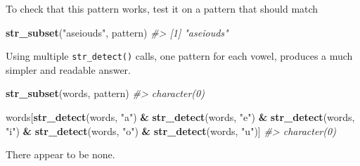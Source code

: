 \documentclass[]{book}
\newenvironment{Shaded}{\begin{snugshade}}{\end{snugshade}}
\newcommand{\CommentTok}[1]{\textcolor[rgb]{0.56,0.35,0.01}{\textit{#1}}}
\newcommand{\ControlFlowTok}[1]{\textcolor[rgb]{0.13,0.29,0.53}{\textbf{#1}}}
\newcommand{\DataTypeTok}[1]{\textcolor[rgb]{0.13,0.29,0.53}{#1}}
\newcommand{\DecValTok}[1]{\textcolor[rgb]{0.00,0.00,0.81}{#1}}
\newcommand{\KeywordTok}[1]{\textcolor[rgb]{0.13,0.29,0.53}{\textbf{#1}}}
\newcommand{\NormalTok}[1]{#1}
\newcommand{\OperatorTok}[1]{\textcolor[rgb]{0.81,0.36,0.00}{\textbf{#1}}}
\newcommand{\StringTok}[1]{\textcolor[rgb]{0.31,0.60,0.02}{#1}}
\theoremstyle{plain}
\theoremstyle{remark}
\begin{document}
\begin{enumerate}
\begin{Shaded}
\end{Shaded}

  To check that this pattern works, test it on a pattern that should
  match

\begin{Shaded}
\begin{Highlighting}[]
\KeywordTok{str_subset}\NormalTok{(}\StringTok{"aseiouds"}\NormalTok{, pattern)}
\CommentTok{#> [1] "aseiouds"}
\end{Highlighting}
\end{Shaded}

  Using multiple \texttt{str\_detect()} calls, one pattern for each
  vowel, produces a much simpler and readable answer.

\begin{Shaded}
\begin{Highlighting}[]
\KeywordTok{str_subset}\NormalTok{(words, pattern)}
\CommentTok{#> character(0)}

\NormalTok{words[}\KeywordTok{str_detect}\NormalTok{(words, }\StringTok{"a"}\NormalTok{) }\OperatorTok{&}
\StringTok{      }\KeywordTok{str_detect}\NormalTok{(words, }\StringTok{"e"}\NormalTok{) }\OperatorTok{&}
\StringTok{      }\KeywordTok{str_detect}\NormalTok{(words, }\StringTok{"i"}\NormalTok{) }\OperatorTok{&}
\StringTok{      }\KeywordTok{str_detect}\NormalTok{(words, }\StringTok{"o"}\NormalTok{) }\OperatorTok{&}
\StringTok{      }\KeywordTok{str_detect}\NormalTok{(words, }\StringTok{"u"}\NormalTok{)]}
\CommentTok{#> character(0)}
\end{Highlighting}
\end{Shaded}

  There appear to be none.
\end{enumerate}
\end{document}
